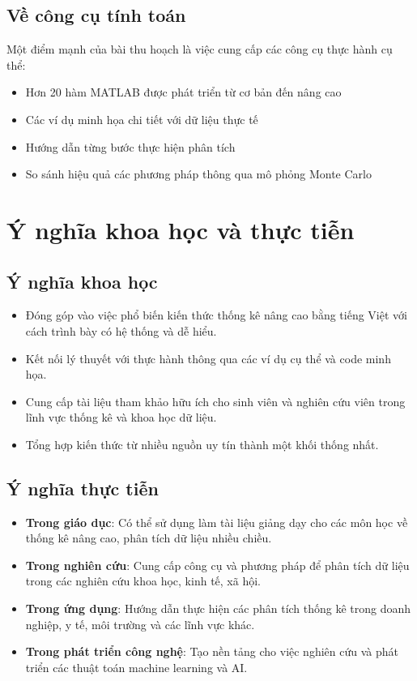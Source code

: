 \subsection*{Về công cụ tính toán}
Một điểm mạnh của bài thu hoạch là việc cung cấp các công cụ thực hành cụ thể:

\begin{itemize}
    \item Hơn 20 hàm MATLAB được phát triển từ cơ bản đến nâng cao
    \item Các ví dụ minh họa chi tiết với dữ liệu thực tế
    \item Hướng dẫn từng bước thực hiện phân tích
    \item So sánh hiệu quả các phương pháp thông qua mô phỏng Monte Carlo
\end{itemize}

\section*{Ý nghĩa khoa học và thực tiễn}

\subsection*{Ý nghĩa khoa học}
\begin{itemize}
    \item Đóng góp vào việc phổ biến kiến thức thống kê nâng cao bằng tiếng Việt với cách trình bày có hệ thống và dễ hiểu.
    
    \item Kết nối lý thuyết với thực hành thông qua các ví dụ cụ thể và code minh họa.
    
    \item Cung cấp tài liệu tham khảo hữu ích cho sinh viên và nghiên cứu viên trong lĩnh vực thống kê và khoa học dữ liệu.
    
    \item Tổng hợp kiến thức từ nhiều nguồn uy tín thành một khối thống nhất.
\end{itemize}

\subsection*{Ý nghĩa thực tiễn}
\begin{itemize}
    \item \textbf{Trong giáo dục}: Có thể sử dụng làm tài liệu giảng dạy cho các môn học về thống kê nâng cao, phân tích dữ liệu nhiều chiều.
    
    \item \textbf{Trong nghiên cứu}: Cung cấp công cụ và phương pháp để phân tích dữ liệu trong các nghiên cứu khoa học, kinh tế, xã hội.
    
    \item \textbf{Trong ứng dụng}: Hướng dẫn thực hiện các phân tích thống kê trong doanh nghiệp, y tế, môi trường và các lĩnh vực khác.
    
    \item \textbf{Trong phát triển công nghệ}: Tạo nền tảng cho việc nghiên cứu và phát triển các thuật toán machine learning và AI.
\end{itemize}

